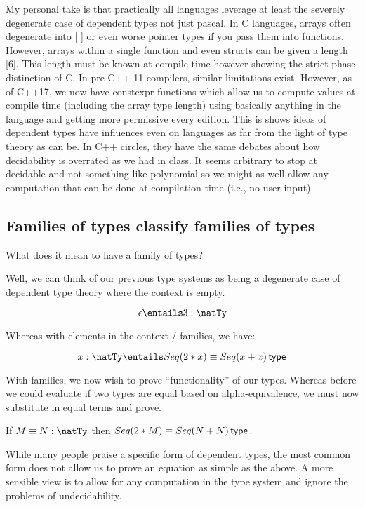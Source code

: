 \documentclass[11pt]{article}
\begin{document}
My personal take is that practically all languages leverage at least the severely degenerate case of dependent types not just pascal. In C languages, arrays often degenerate into [ ] or even worse pointer types if you pass them into functions. However, arrays within a single function and even structs can be given a length [6]. This length must be known at compile time however showing the strict phase distinction of C. In pre C++-11 compilers, similar limitations exist. However, as of C++17, we now have constexpr functions which allow us to compute values at compile time (including the array type length) using basically anything in the language and getting more permissive every edition. This is shows ideas of dependent types have influences even on languages as far from the light of type theory as can be. In C++ circles, they have the same debates about how decidability is overrated as we had in class. It seems arbitrary to stop at decidable and not something like polynomial so we might as well allow any computation that can be done at compilation time (i.e., no user input).

\subsection*{Families of types classify families of types}

What does it mean to have a family of types?

Well, we can think of our previous type systems as being a degenerate case of dependent type theory where the context is empty.

$$\epsilon \entails 3 : \natTy$$

Whereas with elements in the context / families, we have:

$$x : \natTy \entails \eqTp{Seq(2 * x)}{Seq(x + x)}$$

With families, we now wish to prove ``functionality'' of our types. Whereas before we could evaluate if two types are equal based on alpha-equivalence, we must now substitute in equal terms and prove.

If $M \equiv N : \natTy$ then $\eqTp{Seq(2 * M)}{Seq(N + N)}$.

While many people praise a specific form of dependent types, the most common form does not allow us to prove an equation as simple as the above. A more sensible view is to allow for any computation in the type system and ignore the problems of undecidability.
\end{document}

